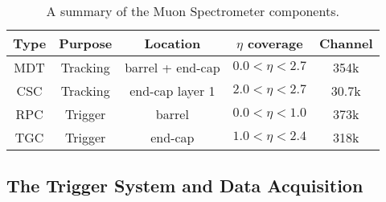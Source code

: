 \begin{table}[htbp]
\begin{center}
\begin{tabular}{ccccc}
\hline
\hline
Type & Purpose & Location & $\eta$ coverage & Channel\\
\hline
MDT & Tracking & barrel + end-cap & $0.0 < \eta < 2.7$ & 354k\\
CSC & Tracking & end-cap layer 1 & $2.0 < \eta < 2.7$ & 30.7k\\
RPC & Trigger & barrel & $0.0 < \eta < 1.0$ & 373k\\
TGC & Trigger & end-cap & $1.0 < \eta < 2.4$ & 318k\\
\hline
\hline
\end{tabular}
\end{center}
\caption{A summary of the Muon Spectrometer components.}
\label{tab:muon_spectrometer_components}
\end{table}%

\subsection{The Trigger System and Data Acquisition}

\subsection{}
